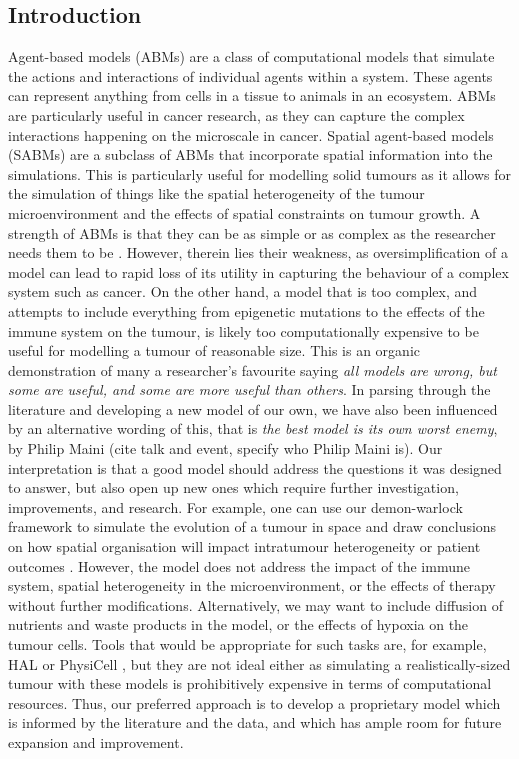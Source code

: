 \subsection{Introduction}
Agent-based models (ABMs) are a class of computational models that simulate the actions and interactions of individual
agents within a system. These agents can represent anything from cells in a tissue to animals in an ecosystem. ABMs
are particularly useful in cancer research, as they can capture the complex interactions happening on the microscale in
cancer. Spatial agent-based models (SABMs) are a subclass of ABMs that incorporate spatial information into the
simulations. This is particularly useful for modelling solid tumours as it allows for the simulation of things like
the spatial heterogeneity of the tumour microenvironment and the effects of spatial constraints on tumour growth.
A strength of ABMs is that they can be as simple or as complex as the researcher needs them to be \cite{colyer_seven-step_2023}.
However, therein lies their weakness, as oversimplification of a model can lead to rapid loss of its utility in
capturing the behaviour of a complex system such as cancer. On the other hand, a model that is too complex, and
attempts to include everything from epigenetic mutations to the effects of the immune system on the tumour, is likely
too computationally expensive to be useful for modelling a tumour of reasonable size. This is an organic demonstration
of many a researcher's favourite saying \textit{all models are wrong, but some are useful, and some are more useful
than others}. In parsing through the literature and developing a new model of our own, we have also been influenced
by an alternative wording of this, that is \textit{the best model is its own worst enemy}, by Philip Maini (cite talk and event, specify who Philip Maini is). Our
interpretation is that a good model should address the questions it was designed to answer, but also open up new
ones which require further investigation, improvements, and research. For example, one can use our demon-warlock
framework \cite{bak_warlock_2023} to simulate the evolution of a tumour in space and draw conclusions on how
spatial organisation will impact intratumour heterogeneity or patient outcomes \cite{noble_when_2020, noble_spatial_2022}.
However, the model does not address the impact of the immune system, spatial heterogeneity in the microenvironment,
or the effects of therapy without further modifications. Alternatively, we may want to include diffusion of
nutrients and waste products in the model, or the effects of hypoxia on the tumour cells. Tools that would be
appropriate for such tasks are, for example, HAL \cite{bravo_hybrid_2020} or PhysiCell \cite{ghaffarizadeh_physicell_2018},
but they are not ideal either as simulating a realistically-sized tumour with these models is prohibitively expensive
in terms of computational resources. Thus, our preferred approach is to develop a proprietary model which is
informed by the literature and the data, and which has ample room for future expansion and improvement.

